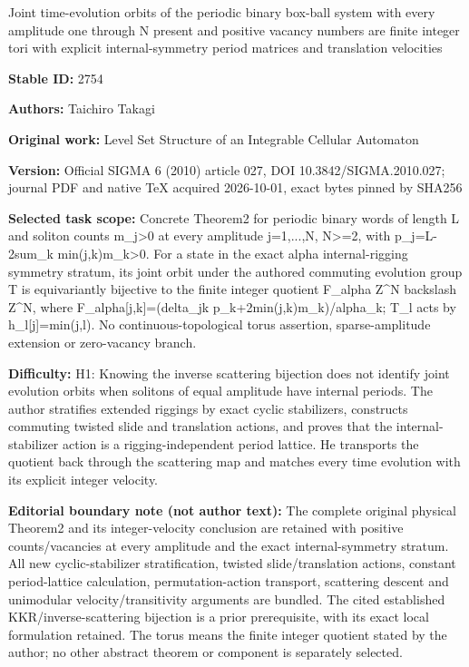 \documentclass[11pt]{article}
\begin{document}
\begin{center}\Large Joint time-evolution orbits of the periodic binary box-ball system with every amplitude one through N present and positive vacancy numbers are finite integer tori with explicit internal-symmetry period matrices and translation velocities\end{center}
\noindent\textbf{Stable ID:} 2754\par
\noindent\textbf{Authors:} Taichiro Takagi\par
\noindent\textbf{Original work:} Level Set Structure of an Integrable Cellular Automaton\par
\noindent\textbf{Version:} Official SIGMA 6 (2010) article 027, DOI 10.3842/SIGMA.2010.027; journal PDF and native TeX acquired 2026-10-01, exact bytes pinned by SHA256\par
\noindent\textbf{Selected task scope:} Concrete Theorem2 for periodic binary words of length L and soliton counts m\_j>0 at every amplitude j=\allowbreak{}1,...,N, N>=\allowbreak{}2, with p\_j=\allowbreak{}L-2sum\_k min(j,k)m\_k>0. For a state in the exact alpha internal-rigging symmetry stratum, its joint orbit under the authored commuting evolution group T is equivariantly bijective to the finite integer quotient F\_alpha Z\textasciicircum{}N backslash Z\textasciicircum{}N, where F\_alpha[j,k]=\allowbreak{}(delta\_jk p\_k+\allowbreak{}2min(j,k)m\_k)/alpha\_k; T\_l acts by h\_l[j]=\allowbreak{}min(j,l). No continuous-topological torus assertion, sparse-amplitude extension or zero-vacancy branch.\par
\noindent\textbf{Difficulty:} H1: Knowing the inverse scattering bijection does not identify joint evolution orbits when solitons of equal amplitude have internal periods. The author stratifies extended riggings by exact cyclic stabilizers, constructs commuting twisted slide and translation actions, and proves that the internal-stabilizer action is a rigging-independent period lattice. He transports the quotient back through the scattering map and matches every time evolution with its explicit integer velocity.\par
\noindent\textbf{Editorial boundary note (not author text):} The complete original physical Theorem2 and its integer-velocity conclusion are retained with positive counts/vacancies at every amplitude and the exact internal-symmetry stratum. All new cyclic-stabilizer stratification, twisted slide/translation actions, constant period-lattice calculation, permutation-action transport, scattering descent and unimodular velocity/transitivity arguments are bundled. The cited established KKR/inverse-scattering bijection is a prior prerequisite, with its exact local formulation retained. The torus means the finite integer quotient stated by the author; no other abstract theorem or component is separately selected.\par
\end{document}
